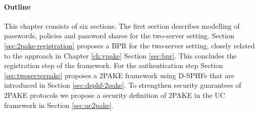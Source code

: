 %

\paragraph{Outline}
This chapter consists of six sections.
The first section describes modelling of passwords, policies and password shares for the two-server setting.
Section \ref{sec:2pake-registration} proposes a \acl{BPR} for the two-server setting, closely related to the approach in Chapter \ref{ch:vpake} Section \ref{sec:bpr}.
This concludes the registration step of the framework.
For the authentication step Section \ref{sec:twoserverpake} proposes a \ac{2PAKE} framework using \acp{D-SPHF} that are introduced in Section \ref{sec:dsphf-2pake}.
To strengthen security guarantees of \ac{2PAKE} protocols we propose a security definition of \ac{2PAKE} in the \ac{UC} framework in Section \ref{sec:uc2pake}.

